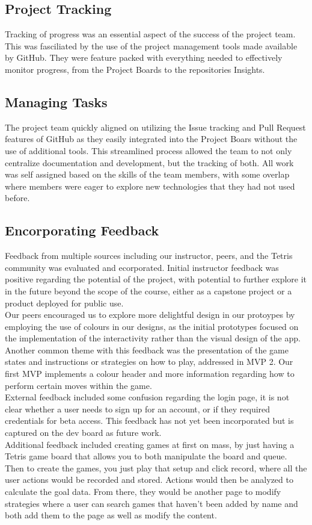\documentclass[english,course]{lecture}
\begin{document}
\subsection{Project Tracking}
Tracking of progress was an essential aspect of the success of the project team. This was fasciliated by the use of the project management tools made available by GitHub. They were feature packed with everything needed to effectively monitor progress, from the Project Boards to the repositories Insights.
%
\subsection{Managing Tasks}
The project team quickly aligned on utilizing the Issue tracking and Pull Request features of GitHub as they easily integrated into the Project Boars without the use of additional tools. This streamlined process allowed the team to not only centralize documentation and development, but the tracking of both. All work was self assigned based on the skills of the team members, with some overlap where members were eager to explore new technologies that they had not used before.
%
\subsection{Encorporating Feedback}
Feedback from multiple sources including our instructor, peers, and the Tetris community was evaluated and ecorporated. Initial instructor feedback was positive regarding the potential of the project, with potential to further explore it in the future beyond the scope of the course, either as a capstone project or a product deployed for public use.
%
\\Our peers encouraged us to explore more delightful design in our protoypes by employing the use of colours in our designs, as the initial prototypes focused on the implementation of the interactivity rather than the visual design of the app. Another common theme with this feedback was the presentation of the game states and instructions or strategies on how to play, addressed in MVP 2. Our first MVP implements a colour header and more information regarding how to perform certain moves within the game.
%
\\External feedback included some confusion regarding the login page, it is not clear whether a user needs to sign up for an account, or if they required credentials for beta access. This feedback has not yet been incorporated but is captured on the dev board as future work.
%
\\Additional feedback included creating games at first on mass, by just having a Tetris game board that allows you to both manipulate the board and queue. Then to create the games, you just play that setup and click record, where all the user actions would be recorded and stored. Actions would then be analyzed to calculate the goal data. From there, they would be another page to modify strategies where a user can search games that haven't been added by name and both add them to the page as well as modify the content.
%
\end{document}
